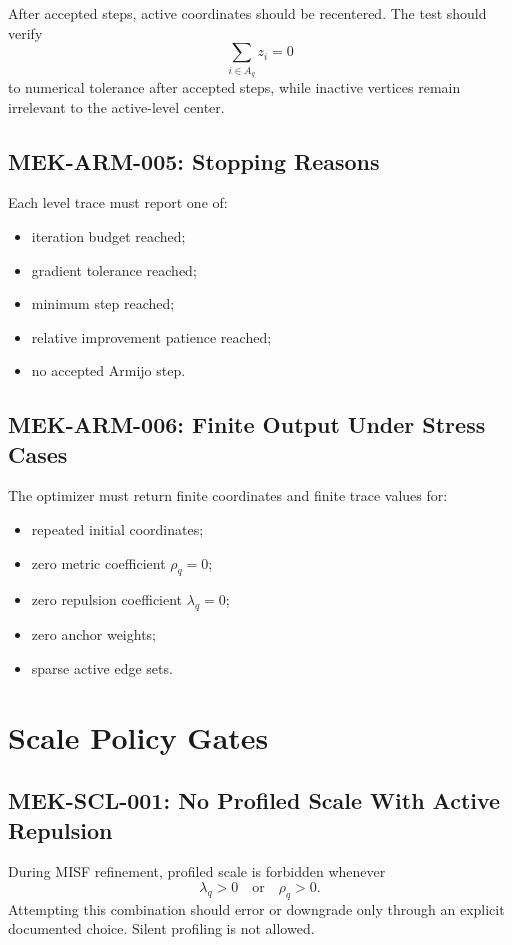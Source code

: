 \documentclass[11pt]{article}
\begin{document}
After accepted steps, active coordinates should be recentered. The test should
verify
\[
  \sum_{i\in A_q} z_i = 0
\]
to numerical tolerance after accepted steps, while inactive vertices remain
irrelevant to the active-level center.

\subsection{MEK-ARM-005: Stopping Reasons}

Each level trace must report one of:
\begin{itemize}[leftmargin=2em]
  \item iteration budget reached;
  \item gradient tolerance reached;
  \item minimum step reached;
  \item relative improvement patience reached;
  \item no accepted Armijo step.
\end{itemize}

\subsection{MEK-ARM-006: Finite Output Under Stress Cases}

The optimizer must return finite coordinates and finite trace values for:
\begin{itemize}[leftmargin=2em]
  \item repeated initial coordinates;
  \item zero metric coefficient \(\rho_q=0\);
  \item zero repulsion coefficient \(\lambda_q=0\);
  \item zero anchor weights;
  \item sparse active edge sets.
\end{itemize}

\section{Scale Policy Gates}

\subsection{MEK-SCL-001: No Profiled Scale With Active Repulsion}

During MISF refinement, profiled scale is forbidden whenever
\[
  \lambda_q > 0 \quad \text{or} \quad \rho_q > 0.
\]
Attempting this combination should error or downgrade only through an explicit
documented choice. Silent profiling is not allowed.
\end{document}
